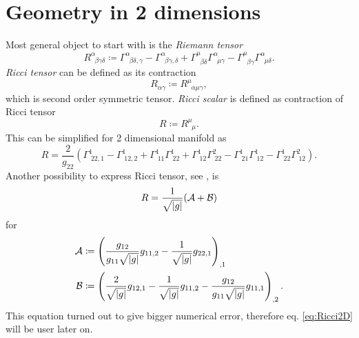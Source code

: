 \section{Geometry in 2 dimensions}
Most general object to start with is the \emph{Riemann tensor}
\begin{equation}
    R^\alpha_{\;\;\beta\gamma\delta}\coloneqq \Gamma^\alpha_{\;\;\beta\delta,\gamma}-\Gamma^\alpha_{\;\;\beta\gamma,\delta}+\Gamma^\mu_{\;\;\beta\delta}\Gamma^\alpha_{\;\;\mu\gamma}-\Gamma^\mu_{\;\;\beta\gamma}\Gamma^\alpha_{\;\;\mu\delta}.
\end{equation}
\emph{Ricci tensor} can be defined as its contraction 
\begin{equation}
    R_{\alpha\gamma}\coloneqq R^\mu_{\;\;\alpha\mu\gamma},
\end{equation}
which is second order symmetric tensor.
\emph{Ricci scalar} is defined as contraction of Ricci tensor
\begin{equation}
    R\coloneqq R^\mu_{\;\;\mu}.
\end{equation}
This can be simplified for 2 dimensional manifold as
\begin{equation}
    R=\frac{2}{g_{22}}\left(\Gamma^1_{\;22,1}-\Gamma^1_{\;12,2}+\Gamma^1_{\;11}\Gamma^1_{\;22}+\Gamma^1_{\;12}\Gamma^2_{\;22}-\Gamma^1_{\;21}\Gamma^1_{\;12}-\Gamma^1_{\;22}\Gamma^2_{\;12}\right).
    \label{eq:Ricci2D}
\end{equation}
Another possibility to express Ricci tensor, see \citet[eq. 6,7]{geometricTensorLipkin}, is
\begin{equation}
    R=\frac{1}{\sqrt{\left|{g}\right|}}(\mathcal{A}+\mathcal{B})
\end{equation}
for
\begin{align}
    \mathcal{A}&\coloneqq \left(\frac{g_{12}}{g_{11}\sqrt{\left|{g}\right|}}g_{11,2}-\frac{1}{\sqrt{\left|{g}\right|}}g_{22,1}\right)_{,1}\\
    \mathcal{B}&\coloneqq \left(\frac{2}{\sqrt{\left|{g}\right|}}g_{12,1}-\frac{1}{\sqrt{\left|{g}\right|}}g_{11,2}-\frac{g_{12}}{g_{11}\sqrt{\left|{g}\right|}}g_{11,1}\right)_{,2}.
\end{align}
This equation turned out to give bigger numerical error, therefore eq. \ref{eq:Ricci2D} will be user later on.


